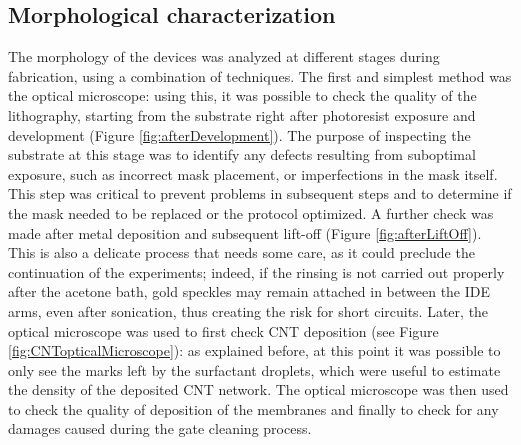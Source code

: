 \subsection{Morphological characterization}
\label{sec:morphoCaracterization}


\begin{figure}
    \centering
     \quad
    \caption{}
    \label{fig:lithoOpticalMicroscope}
\end{figure}

The morphology of the devices was analyzed at different stages during fabrication, using a combination of techniques. The first and simplest method was the optical microscope: using this, it was possible to check the quality of the lithography, starting from the substrate right after photoresist exposure and development (Figure \ref{fig:afterDevelopment}). The purpose of inspecting the substrate at this stage was to identify any defects resulting from suboptimal exposure, such as incorrect mask placement, or imperfections in the mask itself. This step was critical to prevent problems in subsequent steps and to determine if the mask needed to be replaced or the protocol optimized.
A further check was made after metal deposition and subsequent lift-off (Figure \ref{fig:afterLiftOff}). This is also a delicate process that needs some care, as it could preclude the continuation of the experiments; indeed, if the rinsing is not carried out properly after the acetone bath, gold speckles may remain attached in between the IDE arms, even after sonication, thus creating the risk for short circuits.
Later, the optical microscope was used to first check CNT deposition (see Figure \ref{fig:CNTopticalMicroscope}): as explained before, at this point it was possible to only see the marks left by the surfactant droplets, which were useful to estimate the density of the deposited CNT network. The optical microscope was then used to check the quality of deposition of the membranes and finally to check for any damages caused during the gate cleaning process.

